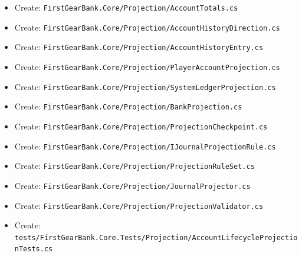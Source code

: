 \documentclass[
  10pt,
  letterpaper,
]{article}
\providecommand{\tightlist}{%
  \setlength{\itemsep}{0pt}\setlength{\parskip}{0pt}}
\begin{document}
\begin{itemize}
\tightlist
\item
  Create:
  \texttt{FirstGearBank.}\allowbreak{}\texttt{Core/}\allowbreak{}\texttt{Projection/}\allowbreak{}\texttt{AccountTotals.}\allowbreak{}\texttt{cs}
\item
  Create:
  \texttt{FirstGearBank.}\allowbreak{}\texttt{Core/}\allowbreak{}\texttt{Projection/}\allowbreak{}\texttt{AccountHistoryDirection.}\allowbreak{}\texttt{cs}
\item
  Create:
  \texttt{FirstGearBank.}\allowbreak{}\texttt{Core/}\allowbreak{}\texttt{Projection/}\allowbreak{}\texttt{AccountHistoryEntry.}\allowbreak{}\texttt{cs}
\item
  Create:
  \texttt{FirstGearBank.}\allowbreak{}\texttt{Core/}\allowbreak{}\texttt{Projection/}\allowbreak{}\texttt{PlayerAccountProjection.}\allowbreak{}\texttt{cs}
\item
  Create:
  \texttt{FirstGearBank.}\allowbreak{}\texttt{Core/}\allowbreak{}\texttt{Projection/}\allowbreak{}\texttt{SystemLedgerProjection.}\allowbreak{}\texttt{cs}
\item
  Create:
  \texttt{FirstGearBank.}\allowbreak{}\texttt{Core/}\allowbreak{}\texttt{Projection/}\allowbreak{}\texttt{BankProjection.}\allowbreak{}\texttt{cs}
\item
  Create:
  \texttt{FirstGearBank.}\allowbreak{}\texttt{Core/}\allowbreak{}\texttt{Projection/}\allowbreak{}\texttt{ProjectionCheckpoint.}\allowbreak{}\texttt{cs}
\item
  Create:
  \texttt{FirstGearBank.}\allowbreak{}\texttt{Core/}\allowbreak{}\texttt{Projection/}\allowbreak{}\texttt{IJournalProjectionRule.}\allowbreak{}\texttt{cs}
\item
  Create:
  \texttt{FirstGearBank.}\allowbreak{}\texttt{Core/}\allowbreak{}\texttt{Projection/}\allowbreak{}\texttt{ProjectionRuleSet.}\allowbreak{}\texttt{cs}
\item
  Create:
  \texttt{FirstGearBank.}\allowbreak{}\texttt{Core/}\allowbreak{}\texttt{Projection/}\allowbreak{}\texttt{JournalProjector.}\allowbreak{}\texttt{cs}
\item
  Create:
  \texttt{FirstGearBank.}\allowbreak{}\texttt{Core/}\allowbreak{}\texttt{Projection/}\allowbreak{}\texttt{ProjectionValidator.}\allowbreak{}\texttt{cs}
\item
  Create:
  \texttt{tests/}\allowbreak{}\texttt{FirstGearBank.}\allowbreak{}\texttt{Core.}\allowbreak{}\texttt{Tests/}\allowbreak{}\texttt{Projection/}\allowbreak{}\texttt{AccountLifecycleProjectionTests.}\allowbreak{}\texttt{cs}

\end{itemize}
\end{document}
